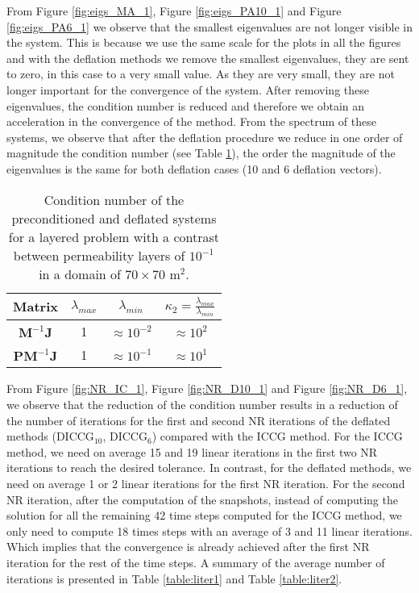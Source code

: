 \documentclass[12pt]{article}
\numberwithin{equation}{section}
\begin{document}
From Figure \ref{fig:eigs_MA_1}, Figure \ref{fig:eigs_PA10_1} and Figure \ref{fig:eigs_PA6_1} we observe that the smallest eigenvalues are not longer visible in the system. This is because we use the same scale for the plots in all the figures and with the deflation methods we remove the smallest eigenvalues, they are sent to zero, in this case to a very small value. As they are very small, they are not longer important for the convergence of the system. After removing these eigenvalues, the condition number is reduced and therefore we obtain an acceleration in the convergence of the method. From the spectrum of these systems, we observe that after the deflation procedure we reduce in one order of magnitude the condition number (see Table \ref{table:cn_1}), the order the magnitude of the eigenvalues is the same for both deflation cases (10 and 6 deflation vectors). \\

\begin{table}[!ht]\centering
\begin{minipage}{.7\textwidth}
\vspace{-10pt}
\centering
\begin{tabular}{ |c|c|c|c|} 
  \hline
 Matrix &$\lambda_{max}$ &$\lambda_{min}$ &$\kappa_2=\frac{\lambda_{max}}{\lambda_{min}}$  \\
  \hline
$\mathbf{M}^{-1}\mathbf{J}$ &1 & $\approx 10^{-2}$&$\approx 10^2$\\
$\mathbf{P}\mathbf{M}^{-1}\mathbf{J}$ &1 & $\approx 10^{-1}$&$\approx 10^1$\\
 \hline
 \end{tabular}
\caption{Condition number of the preconditioned and deflated systems for a layered problem with a contrast between permeability layers of $10^{-1}$ in a domain of $70 \times 70$ m$^2$.}\label{table:cn_1}
\end{minipage}
\end{table}

From Figure \ref{fig:NR_IC_1},  Figure \ref{fig:NR_D10_1} and Figure \ref{fig:NR_D6_1}, we observe that the reduction of the condition number results in a reduction of the number of iterations for the first and second NR iterations of the deflated methods (DICCG$_{10}$, DICCG$_6$) compared with the ICCG method. For the ICCG method, we need on average 15 and 19 linear iterations in the first two NR iterations to reach the desired tolerance. In contrast, for the deflated methods, we need on average 1 or 2 linear iterations for the first NR iteration. For the second NR iteration, after the computation of the snapshots, instead of computing the solution for all the remaining 42 time steps computed for the ICCG method, we only need to compute 18 times steps with an average of 3 and 11 linear iterations. Which implies that the convergence is already achieved after the first NR iteration for the rest of the time steps. A summary of the average number of iterations is presented in Table \ref{table:liter1} and Table \ref{table:liter2}.\\
\end{document}
